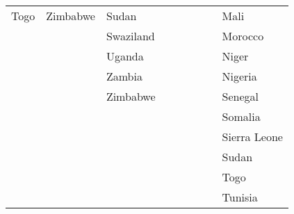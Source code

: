 \begin{longtable}{p{1.75cm}p{1.75cm}p{1.75cm}p{1.75cm}p{1.75cm}p{1.75cm}p{1.75cm}p{1.75cm}p{1.75cm}}
  Togo & Zimbabwe & Sudan &  &  &  &  &  & Mali\\ 
  &  & Swaziland &  &  &  &  &  & Morocco\\ 
  &  & Uganda &  &  &  &  &  & Niger\\ 
  &  & Zambia &  &  &  &  &  & Nigeria\\ 
  &  & Zimbabwe &  &  &  &  &  & Senegal\\ 
  &  &  &  &  &  &  &  & Somalia\\ 
  &  &  &  &  &  &  &  & Sierra Leone\\ 
  &  &  &  &  &  &  &  & Sudan\\ 
  &  &  &  &  &  &  &  & Togo\\ 
  &  &  &  &  &  &  &  & Tunisia\\ 
    \bottomrule
\hline
\end{longtable}
